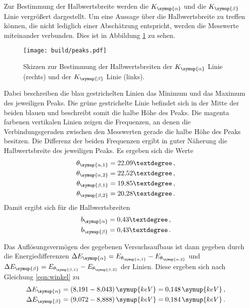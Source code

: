 Zur Bestimmung der Halbwertsbreite werden die $K_{\symup{\alpha}}$ und die
$K_{\symup{\beta}}$ Linie vergrößert dargestellt. Um eine Aussage über die
Halbwertsbreite zu treffen können, die nicht lediglich einer Abschätzung entspricht,
werden die Messwerte miteinander verbunden. Dies ist in Abbildung \ref{fig:hbreite}
zu sehen.

\begin{figure}
  \centering
  \texttt{[image: build/peaks.pdf]}
  \caption{Skizzen zur Bestimmung der Halbwertsbreiten der $K_{\symup{\alpha}}$
  Linie (rechts) und der $K_{\symup{\beta}}$ Linie (links).}
  \label{fig:hbreite}
\end{figure}

Dabei beschreiben die blau gestrichelten Linien das Minimum und das Maximum des
jeweiligen Peaks. Die grüne gestrichelte Linie befindet sich in der Mitte der
beiden blauen und beschreibt somit die halbe Höhe des Peaks. Die magenta farbenen
vertikalen Linien zeigen die Frequenzen, an denen die Verbindungsgeraden zwischen
den Messwerten gerade die halbe Höhe des Peaks besitzen. Die Differenz der beiden
Frequenzen ergibt in guter Näherung die Halbwertsbreite des jeweiligen Peaks.
Es ergeben sich die Werte
\begin{align*}
  \theta_{\symup{\alpha,1}}=22{,}09° \,, \\
  \theta_{\symup{\alpha,2}}=22{,}52° \,, \\
  \theta_{\symup{\beta,1}}=19{,}85° \,, \\
  \theta_{\symup{\beta,2}}=20{,}28° \,.
\end{align*}
Damit ergibt sich für die Halbwertsbreiten
\begin{align*}
  b_{\symup{\alpha}}=0{,}43° \,,\\
  b_{\symup{\beta}}=0{,}43°  \,.
\end{align*}

Das Auflösungsvermögen des gegebenen Versuchsaufbaus ist dann gegeben durch die
Energiedifferenzen $\Delta E_{\symup{\alpha}}=E_{\theta_{\symup{\alpha,1}}}
-E_{\theta_{\symup{\alpha,2}}}$ und $\Delta E_{\symup{\beta}}=
E_{\theta_{\symup{\beta,1}}}-E_{\theta_{\symup{\beta,2}}}$ der Linien. Diese
ergeben sich nach Gleichung \eqref{eqn:winkel} zu
\begin{align*}
  \Delta E_{\symup{\alpha}}=(8{,}191-8{,}043)\,\symup{keV}=0{,}148\,\symup{keV} \,, \\
  \Delta E_{\symup{\beta}}=(9{,}072-8{,}888)\,\symup{keV}=0{,}184\,\symup{keV} \,.
\end{align*}


